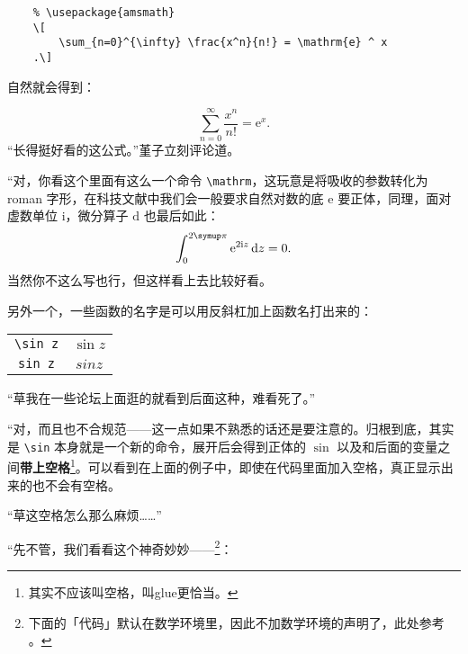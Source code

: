 \begin{lstlisting}
    % \usepackage{amsmath}
    \[
        \sum_{n=0}^{\infty} \frac{x^n}{n!} = \mathrm{e} ^ x
    .\]
\end{lstlisting}

自然就会得到：



\[
    \sum_{n=0}^{\infty} \frac{x^n}{n!} = \mathrm{e} ^ x
    .\]
“长得挺好看的这公式。”堇子立刻评论道。

“对，你看这个里面有这么一个命令 \verb"\mathrm"，这玩意是将吸收的参数转化为 roman 字形，在科技文献中我们会一般要求自然对数的底 $\mathrm{e}$ 要正体，同理，面对虚数单位 $\mathrm{i}$，微分算子 $\mathrm{d}$ 也最后如此：
\[
    \int_0^{2\symup\pi } \mathrm{e} ^ {2 \mathrm{i} z } \,\mathrm{d}z = 0
    .\]
当然你不这么写也行，但这样看上去比较好看。

另外一个，一些函数的名字是可以用反斜杠加上函数名打出来的：

\begin{center}
    \begin{tabular}{cc}
        \verb"\sin z"    &    $\sin z$    \\
        \verb"sin z"     &    $sin z$     \\
    \end{tabular}
\end{center}

“草我在一些论坛上面逛的就看到后面这种，难看死了。”

“对，而且也不合规范——这一点如果不熟悉的话还是要注意的。归根到底，其实是 \verb"\sin" 本身就是一个新的命令，展开后会得到正体的 $\sin $ 以及和后面的变量之间\textbf{带上空格}\footnote{其实不应该叫空格，叫glue更恰当。}。可以看到在上面的例子中，即使在代码里面加入空格，真正显示出来的也不会有空格。

“草这空格怎么那么麻烦……”

“先不管，我们看看这个神奇妙妙——\footnote{下面的「代码」默认在数学环境里，因此不加数学环境的声明了，此处参考 \textcite[Symbols defined by unicode-math]{WillRobertson} 。}：

